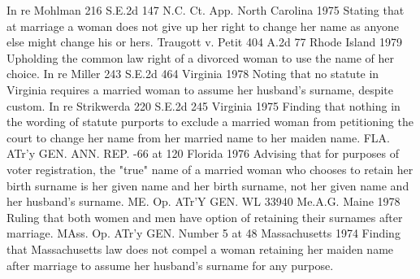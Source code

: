 In re Mohlman	216 S.E.2d 147 N.C. Ct. App.	North Carolina	1975	Stating that at marriage a woman does not give up her right to change her name as anyone else might change his or hers.
Traugott v. Petit	404 A.2d 77	Rhode Island	1979	Upholding the common law right of a divorced woman to use the name of her choice.
In re Miller	243 S.E.2d 464	Virginia	1978	Noting that no statute in Virginia requires a married woman to assume her husband's surname, despite custom.
In re Strikwerda	220 S.E.2d 245	Virginia	1975	Finding that nothing in the wording of statute purports to exclude a married woman from petitioning the court to change her name from her married name to her maiden name.
FLA. ATr'y GEN. ANN. REP.	-66  at 120	Florida	1976	Advising that for purposes of voter registration, the "true" name of a married woman who chooses to retain her birth surname is her given name and her birth surname, not her given name and her husband's surname.
ME. Op. ATr'Y GEN.	WL 33940 Me.A.G.	Maine	1978	Ruling that both women and men have option of retaining their surnames after marriage.
MAss. Op. ATr'y GEN.	Number 5 at 48	Massachusetts	1974	Finding that Massachusetts law does not compel a woman retaining her maiden name after marriage to assume her husband's surname for any purpose.
